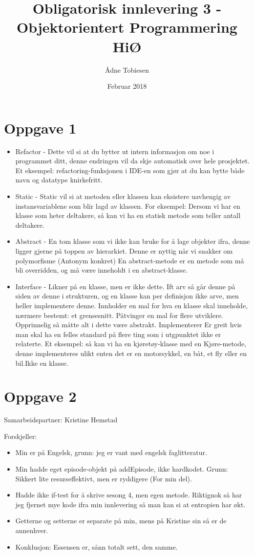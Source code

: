 \documentclass{article}
\title{Obligatorisk innlevering 3 - Objektorientert Programmering HiØ}
\author{Ådne Tobiesen}
\date{Februar 2018}
\begin{document}
   \maketitle
   
   \section*{Oppgave 1}
   \begin{itemize}  
    \item Refactor    - Dette vil si at du bytter ut intern informasjon om noe i programmet ditt, denne endringen vil da skje automatisk over hele prosjektet. Et eksempel: refactoring-funksjonen i IDE-en som gjør at du kan bytte både navn og datatype knirkefritt.
    \item Static - Static vil si at metoden eller klassen kan eksistere uavhengig av instansvariablene som blir lagd av klassen. For eksempel: Dersom vi har en klasse som heter deltakere, så kan vi ha en statisk metode som teller antall deltakere.
    \item Abstract - En tom klasse som vi ikke kan bruke for å lage objekter ifra, denne ligger gjerne på toppen av hierarkiet. Denne er nyttig når vi snakker om polymorfisme (Antonym konkret) En abstract-metode er en metode som må bli overridden, og må være inneholdt i en abstract-klasse.
    
    \item Interface - Likner på en klasse, men er ikke dette. Ift arv så går denne på siden av denne i strukturen, og en klasse kan per definisjon ikke arve, men heller implementere denne.
     Innholder en mal for hva en klasse skal inneholde, nærmere bestemt: et grensesnitt. Påtvinger en mal for flere utviklere. Opprinnelig så måtte alt i dette være abstrakt. Implementerer Er greit hvis man skal ha en felles standard på flere ting som i utgpunktet ikke er relaterte. Et eksempel: så kan vi ha en kjøretøy-klasse med en Kjøre-metode, denne implementeres ulikt enten det er en motorsykkel, en båt, et fly eller en bil.Ikke en klasse. 
    \end{itemize}
   \newpage
   \section*{Oppgave 2}
   Samarbeidspartner: Kristine Hemstad
   
   Forskjeller:
   \begin{itemize}
   \item Min er på Engelsk, grunn: jeg er vant med engelsk faglitteratur.
   \item  Min hadde eget episode-objekt på addEpisode, ikke hardkodet. Grunn: Sikkert lite resurseffektivt, men er ryddigere (For min del).
   \item Hadde ikke if-test for å skrive sesong 4, men egen metode. Riktignok så har jeg fjernet mye kode ifra min innlevering så man kan si at entropien har økt.
   
   \item Getterne og setterne er separate på min, mens på Kristine sin så er de annenhver. 
   
   \item Konklusjon: Essensen er, sånn totalt sett, den samme.
   \end{itemize}
\end{document}
